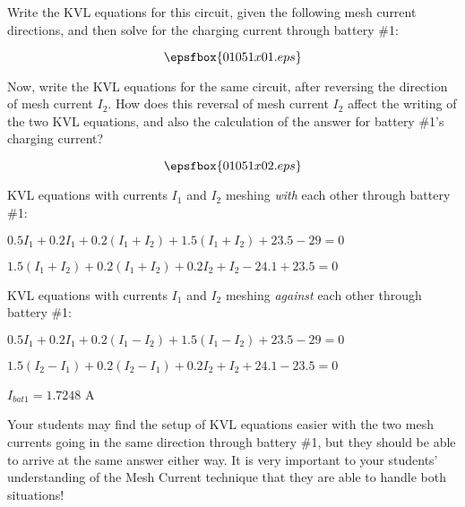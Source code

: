 

Write the KVL equations for this circuit, given the following mesh current directions, and then solve for the charging current through battery \#1:

$$\epsfbox{01051x01.eps}$$

Now, write the KVL equations for the same circuit, after reversing the direction of mesh current $I_2$.  How does this reversal of mesh current $I_2$ affect the writing of the two KVL equations, and also the calculation of the answer for battery \#1's charging current?

$$\epsfbox{01051x02.eps}$$







KVL equations with currents $I_1$ and $I_2$ meshing {\it with} each other through battery \#1:

\vskip 5pt

$0.5I_1 + 0.2I_1 + 0.2(I_1 + I_2) + 1.5(I_1 + I_2) + 23.5 - 29 = 0$

\vskip 5pt

$1.5(I_1 + I_2) + 0.2(I_1 + I_2) + 0.2I_2 + I_2 - 24.1 + 23.5 = 0$

\vskip 20pt

KVL equations with currents $I_1$ and $I_2$ meshing {\it against} each other through battery \#1:

\vskip 5pt

$0.5I_1 + 0.2I_1 + 0.2(I_1 - I_2) + 1.5(I_1 - I_2) + 23.5 - 29 = 0$

\vskip 5pt

$1.5(I_2 - I_1) + 0.2(I_2 - I_1) + 0.2I_2 + I_2 + 24.1 - 23.5 = 0$

\vskip 10pt

$I_{bat1} = 1.7248$ A







Your students may find the setup of KVL equations easier with the two mesh currents going in the same direction through battery \#1, but they should be able to arrive at the same answer either way.  It is very important to your students' understanding of the Mesh Current technique that they are able to handle both situations!



